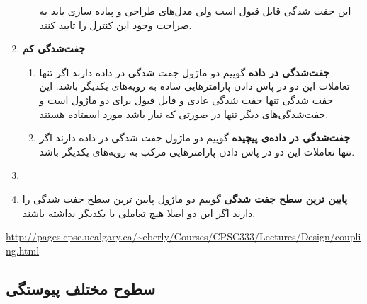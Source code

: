\begin{enumerate}
\begin{enumerate}
این جفت شدگی قابل قبول است ولی مدل‌های طراحی و پیاده سازی باید به صراحت وجود این کنترل را تایید کنند.
\end{enumerate}
\item \textbf{جفت‌شدگی کم} \newline
\begin{enumerate}
\item \textbf{جفت‌شدگی در داده} \newline
گوییم دو ماژول جفت شدگی در داده دارند اگر تنها تعاملات این دو در پاس دادن پارامتر‌هایی ساده به رویه‌های یکدیگر باشد. این جفت شدگی تنها جفت شدگی عادی و قابل قبول برای دو ماژول است و جفت‌شدگی‌های دیگر تنها در صورتی که نیاز باشد مورد اسفتاده هستند.
\item \textbf{جفت‌شدگی در داده‌ی پیچیده} \newline
گوییم دو ماژول جفت شدگی در داده دارند اگر تنها تعاملات این دو در پاس دادن پارامتر‌هایی مرکب به رویه‌های یکدیگر باشد.
\end{enumerate}
\item \item \textbf{پایین ترین سطح جفت شدگی} \newline
گوییم دو ماژول پایین ترین سطح جفت شدگی را دارند اگر این دو اصلا هیچ تعاملی با یکدیگر نداشته باشند.
\end{enumerate}

\url{http://pages.cpsc.ucalgary.ca/~eberly/Courses/CPSC333/Lectures/Design/coupling.html}


\subsection{سطوح مختلف پیوستگی}

